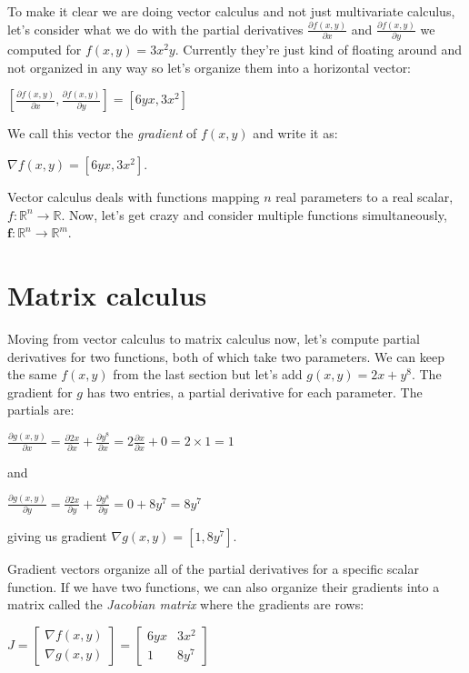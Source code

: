 \documentclass[11pt]{article}
\begin{document}
To make it clear we are doing vector calculus and not just multivariate calculus, let's consider what we do with the partial derivatives $\frac{\partial f(x,y)}{\partial x}$ and $\frac{\partial f(x,y)}{\partial y}$ we computed for $f(x,y) = 3x^2y$. Currently they're just kind of floating around and not organized in any way so let's organize them into a horizontal vector:

$[ \frac{\partial f(x,y)}{\partial x}, \frac{\partial f(x,y)}{\partial y}] = [6yx, 3x^2]$

We call this vector the {\em gradient} of $f(x,y)$ and write it as:

$\nabla f(x,y) = [6yx, 3x^2]$.

Vector calculus deals with functions mapping $n$ real parameters to a real scalar, $f : \mathbb{R}^n \rightarrow \mathbb{R}$.  Now, let's get crazy and consider multiple functions simultaneously, $\mathbf{f}: \mathbb{R}^n \rightarrow \mathbb{R}^m$.

\section{Matrix calculus}

Moving from vector calculus to matrix calculus now, let's compute partial derivatives for two functions, both of which take two parameters.  We can keep the same $f(x,y)$ from the last section but let's add $g(x,y) = 2x + y^8$.  The gradient for $g$ has two entries, a partial derivative for each parameter. The partials are:

$\frac{\partial g(x,y)}{\partial x} = \frac{\partial 2x}{\partial x} + \frac{\partial y^8}{\partial x} = 2\frac{\partial x}{\partial x} + 0 = 2 \times 1 = 1$

and

$\frac{\partial g(x,y)}{\partial y} = \frac{\partial 2x}{\partial y} + \frac{\partial y^8}{\partial y} = 0 + 8y^7 = 8y^7$

giving us gradient $\nabla g(x,y) = [1, 8y^7]$.

Gradient vectors organize all of the partial derivatives for a specific scalar function. If we have two functions, we can also organize their gradients into a matrix called the {\em Jacobian matrix} where the gradients are rows:

$J =
\begin{bmatrix}
	\nabla f(x,y)\\
	\nabla g(x,y)
\end{bmatrix} = \begin{bmatrix}
	6yx & 3x^2\\
	1 & 8y^7
\end{bmatrix}
$
\end{document}
